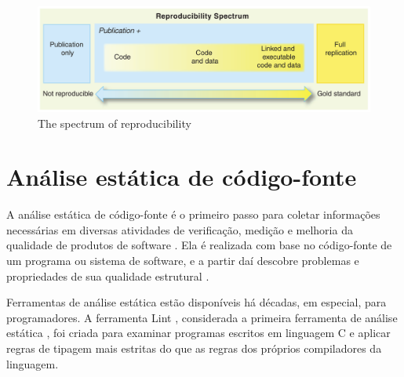 \begin{figure}[h]
  \center
  \includegraphics[scale=0.25]{imagens/reproducibility-spectrum.png}
  \caption{The spectrum of reproducibility\cite{Peng2011}}
  \label{reproducibility-spectrum}
\end{figure}


\section{Análise estática de código-fonte} \label{analise-estatica}

A análise estática de código-fonte é o primeiro passo para coletar informações
necessárias em diversas atividades de verificação, medição e melhoria da
qualidade de produtos de software \cite{Cruz2009, Kirkov2010}. Ela é
realizada com base no código-fonte de um programa ou sistema de software, e a
partir daí descobre problemas e propriedades de sua qualidade estrutural
\cite{Chess2007}.

Ferramentas de análise estática estão disponíveis há décadas, em especial,
para programadores. A ferramenta Lint \cite{Johnson1978}, considerada a
primeira ferramenta de análise estática \cite{Gosain2015}, foi criada para
examinar programas escritos em linguagem C e aplicar regras de tipagem mais
estritas do que as regras dos próprios compiladores da linguagem.

%

